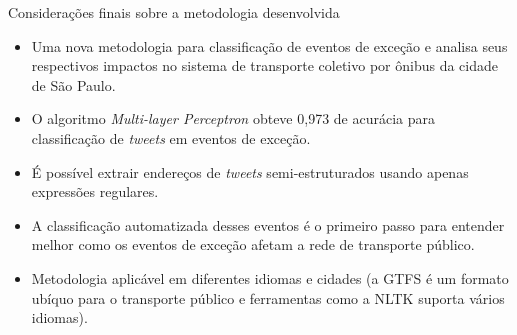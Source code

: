\documentclass{beamer}
\begin{document}
\begin{frame}{Considerações finais sobre a metodologia desenvolvida}
\begin{itemize}
    \item Uma nova metodologia para classificação de eventos de exceção e analisa seus respectivos impactos no sistema de transporte coletivo por ônibus da cidade de São Paulo.
    \item O algoritmo \alert{\textit{Multi-layer Perceptron}} obteve \alert{0,973 de acurácia} para classificação de \textit{tweets} em eventos de exceção.
    \item É possível extrair endereços de \textit{tweets} semi-estruturados usando apenas expressões regulares.
    \item A \alert{classificação automatizada} desses eventos é o primeiro passo para entender melhor como os eventos de exceção afetam a rede de transporte público.
    \item Metodologia aplicável em \alert{diferentes idiomas e cidades} (\alert{a GTFS é um formato ubíquo para o transporte público e ferramentas como a NLTK suporta vários idiomas}).
\end{itemize}
\end{frame}
\end{document}

